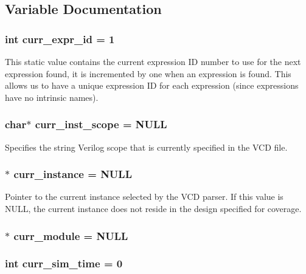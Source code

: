 \subsection{Variable Documentation}
\subsubsection{\setlength{\rightskip}{0pt plus 5cm}int {\bf curr\_\-expr\_\-id} = 1}\label{db_8c_a18}


This static value contains the current expression ID number to use for the next expression found, it is incremented by one when an expression is found. This allows us to have a unique expression ID for each expression (since expressions have no intrinsic names). 
\subsubsection{\setlength{\rightskip}{0pt plus 5cm}char$\ast$ {\bf curr\_\-inst\_\-scope} = NULL}\label{db_8c_a10}


Specifies the string Verilog scope that is currently specified in the VCD file. 
\subsubsection{$\ast$ {\bf curr\_\-instance} = NULL}\label{db_8c_a11}


Pointer to the current instance selected by the VCD parser. If this value is NULL, the current instance does not reside in the design specified for coverage. 
\subsubsection{$\ast$ {\bf curr\_\-module} = NULL}\label{db_8c_a14}


\subsubsection{\setlength{\rightskip}{0pt plus 5cm}int {\bf curr\_\-sim\_\-time} = 0}\label{db_8c_a19}


